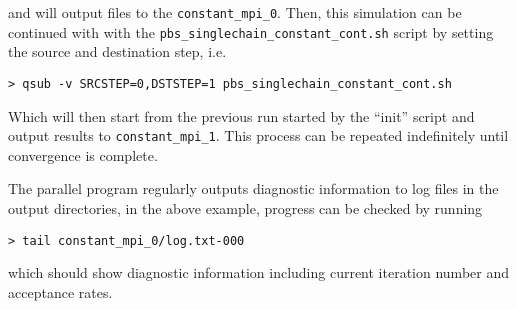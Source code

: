 \documentclass{article}
\begin{document}
and will output files to the {\tt constant\_mpi\_0}. Then, this
simulation can be continued with with the {\tt pbs\_singlechain\_constant\_cont.sh}
script by setting the source and destination step, i.e.

\begin{verbatim}
> qsub -v SRCSTEP=0,DSTSTEP=1 pbs_singlechain_constant_cont.sh
\end{verbatim}

Which will then start from the previous run started by the ``init'' script and
output results to {\tt constant\_mpi\_1}. This process can be repeated indefinitely
until convergence is complete.

The parallel program regularly outputs diagnostic information to log files in the
output directories, in the above example, progress can be checked by running

\begin{verbatim}
> tail constant_mpi_0/log.txt-000
\end{verbatim}

which should show diagnostic information including current iteration number and
acceptance rates.
\end{document}
